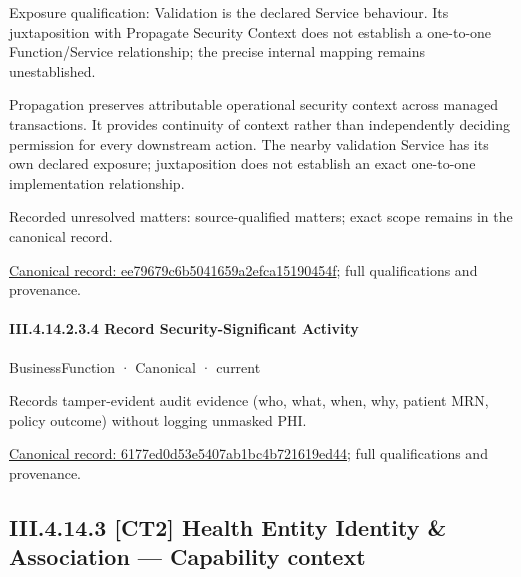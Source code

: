 Exposure qualification: Validation is the declared Service behaviour. Its juxtaposition with Propagate Security Context does not establish a one-to-one Function/Service relationship; the precise internal mapping remains unestablished.



Propagation preserves attributable operational security context across managed transactions. It provides continuity of context rather than independently deciding permission for every downstream action. The nearby validation Service has its own declared exposure; juxtaposition does not establish an exact one-to-one implementation relationship.


{\small Recorded unresolved matters: source-qualified matters; exact scope remains in the canonical record.}\par
{\footnotesize \href{../../../../../../../../continuum/business/business-function/ee79679c6b5041659a2efca15190454f.md}{Canonical record: ee79679c6b5041659a2efca15190454f}; full qualifications and provenance.}\par
\paragraph*{III.4.14.2.3.4 Record Security-Significant Activity}
\label{navigation:III.4.14.2.3.4}

\label{element:6177ed0d53e5407ab1bc4b721619ed44}
{\small BusinessFunction · Canonical · current}\par

Records tamper-evident audit evidence (who, what, when, why, patient MRN, policy outcome) without logging unmasked PHI.


{\footnotesize \href{../../../../../../../../continuum/business/business-function/6177ed0d53e5407ab1bc4b721619ed44.md}{Canonical record: 6177ed0d53e5407ab1bc4b721619ed44}; full qualifications and provenance.}\par
\subsection*{III.4.14.3 [CT2] Health Entity Identity \& Association — Capability context}
\label{navigation:III.4.14.3}


